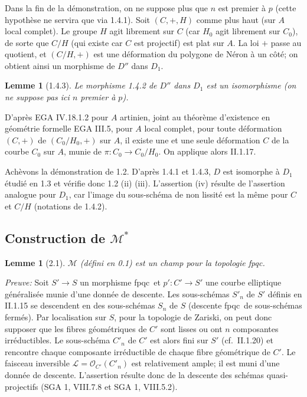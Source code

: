 \documentclass[11pt,a4paper]{amsart}
\theoremstyle{plain}
\newtheorem{lemma}[theorem]{Lemme}
\theoremstyle{definition}
\newcommand{\CO}{\mathcal{O}}
\newcommand{\CL}{\mathcal{L}}
\newcommand{\mll}{\mathcal{M}}
\newcommand{\fpqc}{\textup{fpqc}}
\begin{document}
\subsubsection{}
Dans la fin de la d\'emonstration, on ne suppose plus que $n$ est premier \`a $p$ (cette hypoth\`ese ne servira que via 1.4.1). Soit $(C,+,H)$ comme plus haut (sur $A$ local complet). Le groupe $H$ agit librement sur $C$ (car $H_0$ agit librement sur $C_0$), de sorte que $C/H$ (qui existe car $C$ est projectif) est plat sur $A$. La loi $+$ passe au quotient, et $(C/H,+)$ est une d\'eformation du polygone de N\'eron \`a un c\^ot\'e; on obtient ainsi un morphisme de $D''$ dans $D_1$.

\begin{lemma}[1.4.3]
Le morphisme 1.4.2 de $D''$ dans $D_1$ est un isomorphisme (on ne suppose pas ici $n$ premier \`a $p$).
\end{lemma}

D'apr\`es EGA IV.18.1.2 pour $A$ artinien, joint au th\'eor\`eme d'existence en g\'eom\'etrie formelle EGA III.5, pour $A$ local complet, pour toute d\'eformation $(C,+)$ de $(C_0/H_0,+)$ sur $A$, il existe une et une seule d\'eformation $C$ de la courbe $C_0$ sur $A$, munie de $\pi \colon C_0 \to C_0/H_0$. On applique alors II.1.17.

Ach\`evons la d\'emonstration de 1.2. D'apr\`es 1.4.1 et 1.4.3, $D$ est isomorphe \`a $D_1$ \'etudi\'e en 1.3 et v\'erifie donc 1.2 (ii) (iii). L'assertion (iv) r\'esulte de l'assertion analogue pour $D_1$, car l'image du sous-sch\'ema de non lissit\'e est la m\^eme pour $C$ et $C/H$ (notations de 1.4.2).


\subsection{Construction de $\mll^*$}

\begin{lemma}[2.1]
$\mll$ (d\'efini en 0.1) est un champ pour la topologie \fpqc.
\end{lemma}

\noindent\textit{Preuve:} Soit $S' \to S$ un morphisme \fpqc\ et $p' \colon C' \to S'$ une courbe elliptique g\'en\'eralis\'ee munie d'une donn\'ee de descente. Les sous-sch\'emas $S'_n$ de $S'$ d\'efinis en II.1.15 se descendent en des sous-sch\'emas $S_n$ de $S$ (descente \fpqc\ de sous-sch\'emas ferm\'es). Par localisation sur $S$, pour la topologie de Zariski, on peut donc supposer que les fibres g\'eom\'etriques de $C'$ sont lisses ou ont $n$ composantes irr\'eductibles. Le sous-sch\'ema $C'_n$ de $C'$ est alors fini sur $S'$ (cf.~II.1.20) et rencontre chaque composante irr\'eductible de chaque fibre g\'eom\'etrique de $C'$. Le faisceau inversible $\CL = \CO_{C'}(C'_n)$ est relativement ample; il est muni d'une donn\'ee de descente. L'assertion r\'esulte donc de la descente des sch\'emas quasi-projectifs (SGA 1, VIII.7.8 et SGA 1, VIII.5.2).
\end{document}
